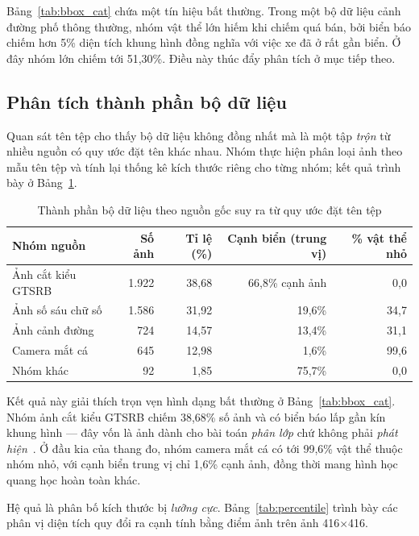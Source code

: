 Bảng~\ref{tab:bbox_cat} chứa một tín hiệu bất thường. Trong một bộ dữ liệu cảnh đường phố thông
thường, nhóm vật thể lớn hiếm khi chiếm quá bán, bởi biển báo chiếm hơn 5\% diện tích khung hình
đồng nghĩa với việc xe đã ở rất gần biển. Ở đây nhóm lớn chiếm tới 51,30\%. Điều này thúc đẩy phân
tích ở mục tiếp theo.

\subsection{Phân tích thành phần bộ dữ liệu}
\label{sec:thanhphan}

Quan sát tên tệp cho thấy bộ dữ liệu không đồng nhất mà là một tập \emph{trộn} từ nhiều nguồn có
quy ước đặt tên khác nhau. Nhóm thực hiện phân loại ảnh theo mẫu tên tệp và tính lại thống kê kích
thước riêng cho từng nhóm; kết quả trình bày ở Bảng~\ref{tab:thanhphan}.

\begin{table}[H]
\centering
\caption{Thành phần bộ dữ liệu theo nguồn gốc suy ra từ quy ước đặt tên tệp}
\label{tab:thanhphan}
\small
\begin{tabular}{lrrrr}
\toprule
\textbf{Nhóm nguồn} & \textbf{Số ảnh} & \textbf{Tỉ lệ (\%)} & \textbf{Cạnh biển (trung vị)} & \textbf{\% vật thể nhỏ} \\
\midrule
Ảnh cắt kiểu GTSRB & 1.922 & 38,68 & 66,8\% cạnh ảnh & 0,0 \\
Ảnh số sáu chữ số  & 1.586 & 31,92 & 19,6\%          & 34,7 \\
Ảnh cảnh đường     & 724   & 14,57 & 13,4\%          & 31,1 \\
Camera mắt cá      & 645   & 12,98 & 1,6\%           & 99,6 \\
Nhóm khác          & 92    & 1,85  & 75,7\%          & 0,0 \\
\bottomrule
\end{tabular}
\end{table}

Kết quả này giải thích trọn vẹn hình dạng bất thường ở Bảng~\ref{tab:bbox_cat}. Nhóm ảnh cắt kiểu
GTSRB chiếm 38,68\% số ảnh và có biển báo lấp gần kín khung hình --- đây vốn là ảnh dành cho bài
toán \emph{phân lớp} chứ không phải \emph{phát hiện}~\cite{stallkamp2012gtsrb}. Ở đầu kia của thang
đo, nhóm camera mắt cá có tới 99,6\% vật thể thuộc nhóm nhỏ, với cạnh biển trung vị chỉ 1,6\% cạnh
ảnh, đồng thời mang hình học quang học hoàn toàn khác.

Hệ quả là phân bố kích thước bị \emph{lưỡng cực}. Bảng~\ref{tab:percentile} trình bày các phân vị
diện tích quy đổi ra cạnh tính bằng điểm ảnh trên ảnh 416$\times$416.

